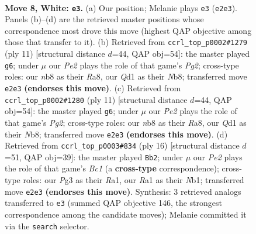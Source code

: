 \documentclass[11pt]{article}
\begin{document}
\begin{figure}[p]\centering
\begin{subfigure}{0.46\textwidth}\centering
\resizebox{\linewidth}{!}{%
\newchessgame
\chessboard[
  setfen={rnbq1rk1/pp2bpp1/4pn2/2pp3p/2P5/1P3NPB/P2PPP1P/RNBQ1RK1 w - - 0 8},
  showmover=false,
  pgfstyle=straightmove, color=movearrow, markmove={e2-e3}
]}
\caption{}
\end{subfigure}\hfill
\begin{subfigure}{0.46\textwidth}\centering
\resizebox{\linewidth}{!}{%
\newchessgame
\chessboard[
  setfen={rn1qkb1r/pb1p1ppp/1p2pn2/2p5/2PP4/3BPN2/PP3PPP/RNBQ1RK1 b kq - 1 6},
  showmover=false,
  pgfstyle=straightmove, color=movearrow, markmove={g7-g6}
]}
\caption{}
\end{subfigure}
\\[4pt]
\begin{subfigure}{0.46\textwidth}\centering
\resizebox{\linewidth}{!}{%
\newchessgame
\chessboard[
  setfen={rn1qkb1r/pb1p1ppp/1p2pn2/2p5/2PP4/3BPN2/PP3PPP/RNBQ1RK1 b kq - 1 6},
  showmover=false,
  pgfstyle=straightmove, color=movearrow, markmove={g7-g6}
]}
\caption{}
\end{subfigure}\hfill
\begin{subfigure}{0.46\textwidth}\centering
\resizebox{\linewidth}{!}{%
\newchessgame
\chessboard[
  setfen={rnbq1rk1/p1p1bppp/4pn2/8/PpBP4/1P2PN2/5PPP/RNBQ1RK1 w - - 1 9},
  showmover=false,
  pgfstyle=straightmove, color=movearrow, markmove={c1-b2}
]}
\caption{}
\end{subfigure}
\caption{\textbf{Move 8, White: \texttt{e3}.} (a) Our position; Melanie plays \texttt{e3} (\texttt{e2e3}). Panels (b)--(d) are the retrieved master positions whose correspondence most drove this move (highest QAP objective among those that transfer to it). (b) Retrieved from \texttt{ccrl\_top\_p0002\#1279} (ply 11) [structural distance $d$=44, QAP obj=54]: the master played \texttt{g6}; under $\mu$ our \emph{Pe2} plays the role of that game's \emph{Pg2}; cross-type roles: our \emph{n}b8 as their \emph{R}a8, our \emph{Q}d1 as their \emph{N}b8; transferred move \texttt{e2e3} \textbf{(endorses this move)}. (c) Retrieved from \texttt{ccrl\_top\_p0002\#1280} (ply 11) [structural distance $d$=44, QAP obj=54]: the master played \texttt{g6}; under $\mu$ our \emph{Pe2} plays the role of that game's \emph{Pg2}; cross-type roles: our \emph{n}b8 as their \emph{R}a8, our \emph{Q}d1 as their \emph{N}b8; transferred move \texttt{e2e3} \textbf{(endorses this move)}. (d) Retrieved from \texttt{ccrl\_top\_p0003\#834} (ply 16) [structural distance $d$=51, QAP obj=39]: the master played \texttt{Bb2}; under $\mu$ our \emph{Pe2} plays the role of that game's \emph{Bc1} (a \textbf{cross-type} correspondence); cross-type roles: our \emph{P}g3 as their \emph{R}a1, our \emph{R}a1 as their \emph{N}b1; transferred move \texttt{e2e3} \textbf{(endorses this move)}. Synthesis: 3 retrieved analogs transferred to \texttt{e3} (summed QAP objective 146, the strongest correspondence among the candidate moves); Melanie committed it via the \texttt{search} selector.}
\label{fig:thought-m14}
\end{figure}
\end{document}
